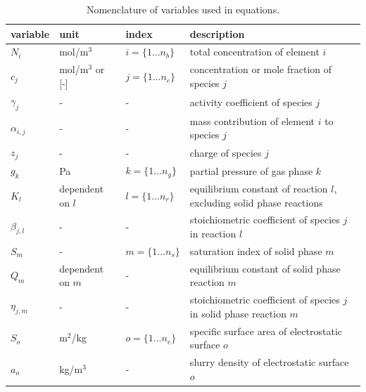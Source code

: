 \documentclass{article}
\begin{document}
\begin{table}[H]
\centering
\caption{Nomenclature of variables used in equations.}
\label{table:variables}
\begin{tabular}{l|l|l|l}
\toprule
variable        & unit                      & index                     & description                           \\ \midrule
$N_i$           & mol/m$^3$                 & $i = \{1 \ldots n_b\}$    & total concentration of element $i$                        \\
$c_j$           & mol/m$^3$  or [-]         & $j = \{1 \ldots n_c\}$    & concentration or mole fraction of species $j$                      \\
$\gamma_j$      & -                         & -                         & activity coefficient of species $j$                      \\
$\alpha_{i,j}$  &    -                      & -                         & mass contribution of element $i$ to species $j$ \\
$z_j$           &    -                      & -                         & charge of species $j$ \\
$g_k$           & Pa                        & $k = \{1 \ldots n_g\}$    & partial pressure of gas phase $k$                         \\
$K_l$           & dependent on $l$          & $l = \{1 \ldots n_r\}$    & equilibrium constant of reaction $l$, excluding solid phase reactions                      \\
$\beta_{j,l}$   & -                         & -                         & stoichiometric coefficient of species $j$ in reaction $l$\\
$S_m$           & -                         & $m = \{1 \ldots n_s\}$    & saturation index of solid phase $m$                      \\
$Q_m$           & dependent on $m$          & -                         & equilibrium constant of solid phase reaction $m$         \\
$\eta_{j,m}$    & -                         & -                         & stoichiometric coefficient of species $j$ in solid phase reaction $m$\\
$S_o$           & m$^2$/kg                  & $o = \{1 \ldots n_e\}$    & specific surface area of electrostatic surface $o$        \\
$a_o$           & kg/m$^3$                  & -                         & slurry density of electrostatic surface $o$        \\

\end{tabular}
\end{table}
\end{document}
